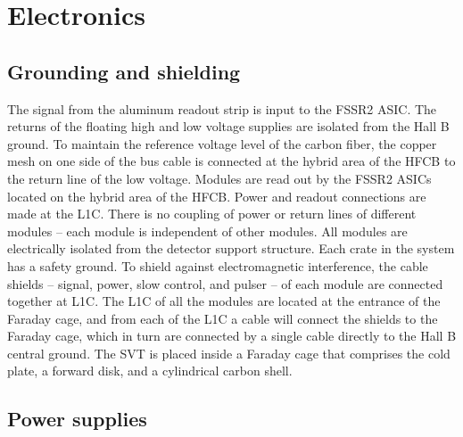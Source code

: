 \section{Electronics}

\subsection{Grounding and shielding}

The signal from the aluminum readout strip is input to the FSSR2 ASIC. The returns of the floating high and low voltage supplies are isolated from the Hall B ground. To maintain the reference voltage level of the carbon fiber, the copper mesh on one side of the bus cable is connected at the hybrid area of the HFCB to the return line of the low voltage. Modules are read out by the FSSR2 ASICs located on the hybrid area of the HFCB. Power and readout connections are made at the L1C. There is no coupling of power or return lines of different modules -- each module is independent of other modules. All modules are electrically isolated from the detector support structure. 
Each crate in the system has a safety ground. To shield against electromagnetic interference, the cable shields -- signal, power, slow control, and pulser -- of each module are connected together at L1C. The L1C of all the modules are located at the entrance of the Faraday cage, and from each of the L1C a cable will connect the shields to the Faraday cage, which in turn are connected by a single cable directly to the Hall B central ground. The SVT is placed inside a Faraday cage that comprises the cold plate, a forward disk, and a cylindrical carbon shell.

\subsection{Power supplies}

